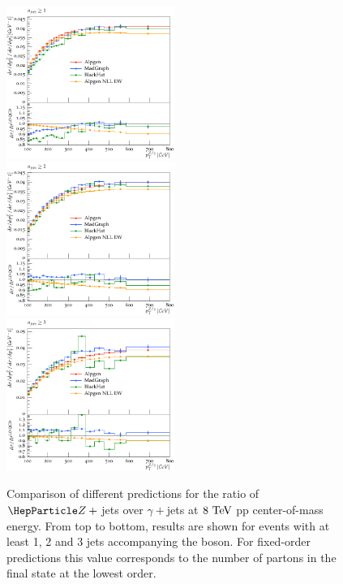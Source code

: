\documentclass[11pt]{cernrep}
\begin{document}
\begin{figure}
\begin{center}
\includegraphics[width=0.49\textwidth]{d07-x01-y01-mc.pdf} \\
\includegraphics[width=0.49\textwidth]{d08-x01-y01-mc.pdf} \\
\includegraphics[width=0.49\textwidth]{d08-x02-y01-mc.pdf}
 \caption{Comparison of different predictions for the ratio of
   $\PZ+{}$jets over $\gamma+{}$jets at $8~\text{TeV}$ pp 
   center-of-mass energy. From top to bottom, results are shown for events with at least 1, 2 and 3 jets accompanying the
   boson. For fixed-order predictions this value corresponds to the number of partons in the final state at the lowest order.}
\label{zgrmc}
\end{center}
\end{figure}
\end{document}
